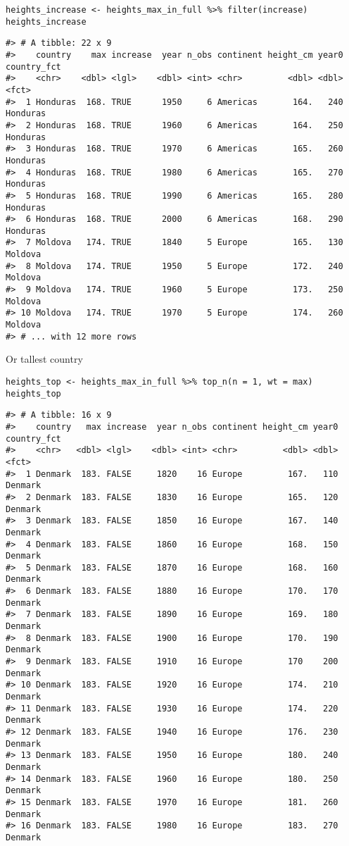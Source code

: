 \begin{verbatim}
heights_increase <- heights_max_in_full %>% filter(increase)
heights_increase
\end{verbatim}

\begin{verbatim}
#> # A tibble: 22 x 9
#>    country    max increase  year n_obs continent height_cm year0 country_fct
#>    <chr>    <dbl> <lgl>    <dbl> <int> <chr>         <dbl> <dbl> <fct>      
#>  1 Honduras  168. TRUE      1950     6 Americas       164.   240 Honduras   
#>  2 Honduras  168. TRUE      1960     6 Americas       164.   250 Honduras   
#>  3 Honduras  168. TRUE      1970     6 Americas       165.   260 Honduras   
#>  4 Honduras  168. TRUE      1980     6 Americas       165.   270 Honduras   
#>  5 Honduras  168. TRUE      1990     6 Americas       165.   280 Honduras   
#>  6 Honduras  168. TRUE      2000     6 Americas       168.   290 Honduras   
#>  7 Moldova   174. TRUE      1840     5 Europe         165.   130 Moldova    
#>  8 Moldova   174. TRUE      1950     5 Europe         172.   240 Moldova    
#>  9 Moldova   174. TRUE      1960     5 Europe         173.   250 Moldova    
#> 10 Moldova   174. TRUE      1970     5 Europe         174.   260 Moldova    
#> # ... with 12 more rows
\end{verbatim}

Or tallest country

\begin{verbatim}
heights_top <- heights_max_in_full %>% top_n(n = 1, wt = max)
heights_top
\end{verbatim}

\begin{verbatim}
#> # A tibble: 16 x 9
#>    country   max increase  year n_obs continent height_cm year0 country_fct
#>    <chr>   <dbl> <lgl>    <dbl> <int> <chr>         <dbl> <dbl> <fct>      
#>  1 Denmark  183. FALSE     1820    16 Europe         167.   110 Denmark    
#>  2 Denmark  183. FALSE     1830    16 Europe         165.   120 Denmark    
#>  3 Denmark  183. FALSE     1850    16 Europe         167.   140 Denmark    
#>  4 Denmark  183. FALSE     1860    16 Europe         168.   150 Denmark    
#>  5 Denmark  183. FALSE     1870    16 Europe         168.   160 Denmark    
#>  6 Denmark  183. FALSE     1880    16 Europe         170.   170 Denmark    
#>  7 Denmark  183. FALSE     1890    16 Europe         169.   180 Denmark    
#>  8 Denmark  183. FALSE     1900    16 Europe         170.   190 Denmark    
#>  9 Denmark  183. FALSE     1910    16 Europe         170    200 Denmark    
#> 10 Denmark  183. FALSE     1920    16 Europe         174.   210 Denmark    
#> 11 Denmark  183. FALSE     1930    16 Europe         174.   220 Denmark    
#> 12 Denmark  183. FALSE     1940    16 Europe         176.   230 Denmark    
#> 13 Denmark  183. FALSE     1950    16 Europe         180.   240 Denmark    
#> 14 Denmark  183. FALSE     1960    16 Europe         180.   250 Denmark    
#> 15 Denmark  183. FALSE     1970    16 Europe         181.   260 Denmark    
#> 16 Denmark  183. FALSE     1980    16 Europe         183.   270 Denmark
\end{verbatim}

